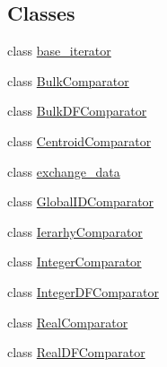 \subsection*{Classes}
\begin{DoxyCompactItemize}
\item 
class \hyperlink{classINMOST_1_1Mesh_1_1base__iterator}{base\-\_\-iterator}
\item 
class \hyperlink{classINMOST_1_1Mesh_1_1BulkComparator}{Bulk\-Comparator}
\item 
class \hyperlink{classINMOST_1_1Mesh_1_1BulkDFComparator}{Bulk\-D\-F\-Comparator}
\item 
class \hyperlink{classINMOST_1_1Mesh_1_1CentroidComparator}{Centroid\-Comparator}
\item 
class \hyperlink{classINMOST_1_1Mesh_1_1exchange__data}{exchange\-\_\-data}
\item 
class \hyperlink{classINMOST_1_1Mesh_1_1GlobalIDComparator}{Global\-I\-D\-Comparator}
\item 
class \hyperlink{classINMOST_1_1Mesh_1_1IerarhyComparator}{Ierarhy\-Comparator}
\item 
class \hyperlink{classINMOST_1_1Mesh_1_1IntegerComparator}{Integer\-Comparator}
\item 
class \hyperlink{classINMOST_1_1Mesh_1_1IntegerDFComparator}{Integer\-D\-F\-Comparator}
\item 
class \hyperlink{classINMOST_1_1Mesh_1_1RealComparator}{Real\-Comparator}
\item 
class \hyperlink{classINMOST_1_1Mesh_1_1RealDFComparator}{Real\-D\-F\-Comparator}
\end{DoxyCompactItemize}
